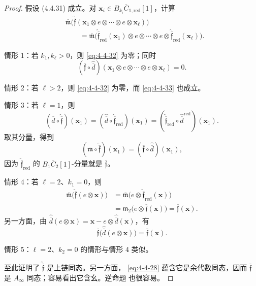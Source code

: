 \begin{proof}
假设 (4.4.31) 成立。对
$\mathbf x_i\in B_{k_i}\overline C_{1,\mathrm{red}}[1]$，计算
\begin{equation}
 \begin{aligned}
 &\overline{\mathfrak m}\bigl(
 \widehat{\overline{\mathfrak f}}
 (\mathbf x_1\otimes e\otimes\cdots\otimes e\otimes\mathbf x_\ell)
 \bigr)\\
 &\qquad=
 \overline{\mathfrak m}\bigl(
 \widehat{\overline{\mathfrak f}}_{\mathrm{red}}(\mathbf x_1)
 \otimes e\otimes\cdots\otimes e\otimes
 \widehat{\overline{\mathfrak f}}_{\mathrm{red}}(\mathbf x_\ell)
 \bigr).
 \end{aligned}
\tag{4.4.32}\label{eq:4-4-32}
\end{equation}

情形 1：若 $k_1,k_\ell>0$，则 \eqref{eq:4-4-32} 为零；同时
\begin{equation}
 (\overline{\mathfrak f}\circ\widehat{\overline d})
 (\mathbf x_1\otimes e\otimes\cdots\otimes e\otimes\mathbf x_\ell)=0.
\tag{4.4.33}\label{eq:4-4-33}
\end{equation}

情形 2：若 $\ell>2$，则 \eqref{eq:4-4-32} 为零，而
\eqref{eq:4-4-33} 也成立。

情形 3：若 $\ell=1$，则
\[
 (\widehat{\overline d}\circ
 \widehat{\overline{\mathfrak f}})(\mathbf x_1)
 =
 (\widehat{\overline d}\circ
 \widehat{\overline{\mathfrak f}}_{\mathrm{red}})(\mathbf x_1)
 =
 (\widehat{\overline{\mathfrak f}}_{\mathrm{red}}
 \circ\widehat{\overline d}^{\mathrm{red}})(\mathbf x_1).
\]
取其分量，得到
\[
 (\overline{\mathfrak m}\circ
 \widehat{\overline{\mathfrak f}})(\mathbf x_1)
 =
 (\overline{\mathfrak f}\circ\widehat{\overline d})(\mathbf x_1),
\]
因为
$\widehat{\overline{\mathfrak f}}_{\mathrm{red}}$ 的
$B_1\overline C_2[1]$-分量就是 $\overline{\mathfrak f}$。

情形 4：若 $\ell=2$、$k_1=0$，则
\[
 \begin{aligned}
 \overline{\mathfrak m}
 \bigl(\widehat{\overline{\mathfrak f}}(e\otimes\mathbf x)\bigr)
 &=\overline{\mathfrak m}
 \bigl(e\otimes
 \widehat{\overline{\mathfrak f}}_{\mathrm{red}}(\mathbf x)\bigr)\\
 &=\overline{\mathfrak m}_2
 \bigl(e\otimes\overline{\mathfrak f}(\mathbf x)\bigr)
 =\overline{\mathfrak f}(\mathbf x).
 \end{aligned}
\]
另一方面，由
$\widehat{\overline d}(e\otimes\mathbf x)
=\mathbf x-e\otimes\widehat{\overline d}(\mathbf x)$，有
\[
 \overline{\mathfrak f}
 \bigl(\widehat{\overline d}(e\otimes\mathbf x)\bigr)
 =\overline{\mathfrak f}(\mathbf x).
\]

情形 5：$\ell=2$、$k_2=0$ 的情形与情形 4 类似。

至此证明了 $\widehat{\overline{\mathfrak f}}$ 是上链同态。另一方面，
\eqref{eq:4-4-28} 蕴含它是余代数同态，因而
$\overline{\mathfrak f}$ 是 $A_\infty$ 同态；容易看出它含幺。逆命题
也很容易。
\end{proof}

